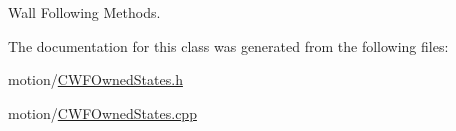Wall Following Methods. 

The documentation for this class was generated from the following files\+:\begin{DoxyCompactItemize}
\item 
motion/\mbox{\hyperlink{CWFOwnedStates_8h}{C\+W\+F\+Owned\+States.\+h}}\item 
motion/\mbox{\hyperlink{CWFOwnedStates_8cpp}{C\+W\+F\+Owned\+States.\+cpp}}\end{DoxyCompactItemize}
